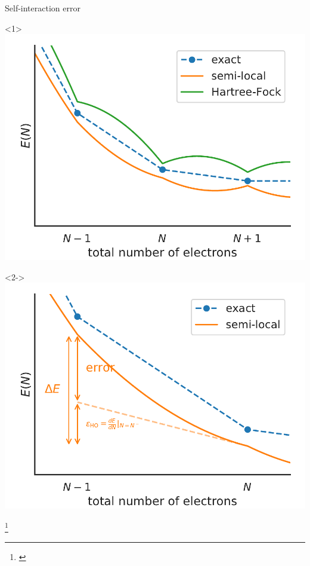 \documentclass[xcolor=table,aspectratio=169]{beamer}
\newcommand\blfootcite[1]{%
  \begingroup
  \renewcommand\thefootnote{}\footnote{\hspace{-4ex}\cite{#1}}%
  \addtocounter{footnote}{-1}%
  \endgroup
}
\numberwithin{equation}{section}
\begin{document}
\begin{frame}{Self-interaction error}

   \begin{overlayarea}{\textwidth}{0.7\textheight}
      \begin{center}
         \begin{onlyenv}<1>
            \includegraphics[height=0.7\textheight]{figures/curvature_plot/fig_en_curve_with_all.pdf}
         \end{onlyenv}


         \begin{onlyenv}<2->
            \includegraphics[height=0.7\textheight]{figures/curvature_plot/fig_en_curve_sl_annotated_zoom.pdf}
         \end{onlyenv}
      \end{center}

   \end{overlayarea}

   \blfootcite{Cohen2008,Li2017}

\end{frame}
\end{document}
